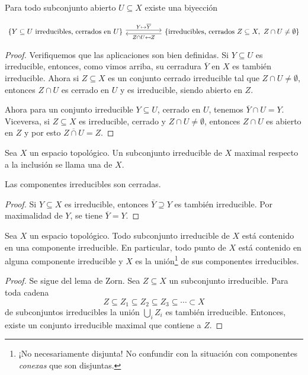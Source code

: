 \documentclass{article}
\numberwithin{equation}{section}
\theoremstyle{definition}
\begin{document}
\begin{proposicion}
  Para todo subconjunto abierto $U \subseteq X$ existe una biyección

  \[ \begin{tikzcd}[column sep=5em]
      \{ Y\subseteq U\text{ irreducibles, cerrados en }U \} \ar[shift left=0.25em]{r}{Y \mapsto \overline{Y}} & \{ \text{irreducibles, cerrados }Z\subseteq X, ~ Z\cap U \ne \emptyset \}\ar[shift left=0.25em]{l}{Z\cap U \mapsfrom Z}
    \end{tikzcd} \]

  \begin{proof}
    Verifiquemos que las aplicaciones son bien definidas. Si $Y \subseteq U$
    es irreducible, entonces, como vimos arriba, su cerradura $\overline{Y}$
    en $X$ es también irreducible. Ahora si $Z \subseteq X$ es un conjunto
    cerrado irreducible tal que $Z\cap U \ne \emptyset$, entonces $Z\cap U$
    es cerrado en $U$ y es irreducible, siendo abierto en $Z$.

    Ahora para un conjunto irreducible $Y \subseteq U$, cerrado en $U$, tenemos
    $\overline{Y} \cap U = Y$. Viceversa, si $Z \subseteq X$ es irreducible,
    cerrado y $Z\cap U \ne \emptyset$, entonces $Z\cap U$ es abierto en $Z$ y
    por esto $\overline{Z\cap U} = Z$.
  \end{proof}
\end{proposicion}

\begin{definicion}
  Sea $X$ un espacio topológico. Un subconjunto irreducible de $X$ maximal
  respecto a la inclusión se llama una  de $X$.
\end{definicion}

\begin{observacion}
  Las componentes irreducibles son cerradas.

  \begin{proof}
    Si $Y \subseteq X$ es irreducible, entonces $\overline{Y} \supseteq Y$ es
    también irreducible. Por maximalidad de $Y$, se tiene $\overline{Y} = Y$.
  \end{proof}
\end{observacion}

\begin{proposicion}
  Sea $X$ un espacio topológico. Todo subconjunto irreducible de $X$ está
  contenido en una componente irreducible. En particular, todo punto de $X$ está
  contenido en alguna componente irreducible y $X$ es la unión\footnote{¡No
    necesariamente disjunta! No confundir con la situación con componentes
    \emph{conexas} que son disjuntas.} de sus componentes irreducibles.

  \begin{proof}
    Se sigue del lema de Zorn. Sea $Z \subseteq X$ un subconjunto
    irreducible. Para toda cadena
    $$Z \subseteq Z_1 \subseteq Z_2 \subseteq Z_3 \subseteq \cdots \subset X$$
    de subconjuntos irreducibles la unión $\bigcup_i Z_i$ es también
    irreducible. Entonces, existe un conjunto irreducible maximal que contiene
    a $Z$.
  \end{proof}
\end{proposicion}
\end{document}
